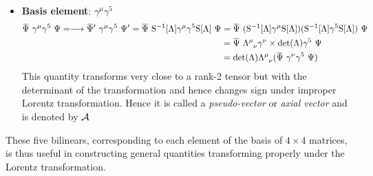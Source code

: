 \begin{itemize}
\begin{align*}
   \dadj{\Psi}'\ \gamma^5 \ \Psi' &= -\frac{i}{4!}\dadj{\Psi}\ \varepsilon_{\mu\nu\rho\theta}\gamma^\mu\gamma^\nu\gamma^\rho\gamma^\theta \det(\Lambda)\ \Psi \\
   &=\det(\Lambda)(\dadj{\Psi}\ \gamma^5 \ \Psi)
\end{align*}
This quantity changes almost like a scalar but with the determinant of the transformation. For proper Lorentz element, $\det(\Lambda)=1$ and hence this is invariant, however, a minus sign is introduced for improper Lorentz transformation. Hence this is instead called a \textit{pseudo-scalar} and is denoted by $\SP$
 \item  \textbf{Basis element}: $\gamma^\mu\gamma^5$
 \begin{align*}
  \bili{\gamma^\mu\gamma^5} =  \longrightarrow \dadj{\Psi}'\ \gamma^\mu\gamma^5 \ \Psi' = \dadj{\Psi}\ \lrepinv \gamma^\mu\gamma^5\lrep \ \Psi &=\dadj{\Psi}\ (\lrepinv \gamma^\mu \lrep) (\lrepinv\gamma^5\lrep) \ \Psi \\&= \dadj{\Psi}\ \trmat{\mu}{\nu} \gamma^\nu \times \det(\Lambda) \gamma^5 \ \Psi\\
  &=\det(\Lambda)\trmat{\mu}{\nu} (\dadj{\Psi}\ \gamma^\nu\gamma^5 \ \Psi)
 \end{align*}
 This quantity transforms very close to a rank-2 tensor but with the determinant of the transformation and hence changes sign under improper Lorentz transformation. Hence it is called a \textit{pseudo-vector} or \textit{axial vector} and is denoted by $\mathcal A$
\end{itemize}
These five bilinears, corresponding to each element of the basis of $4\times 4$ matrices, is thus useful in constructing general quantities transforming properly under the Lorentz transformation. 